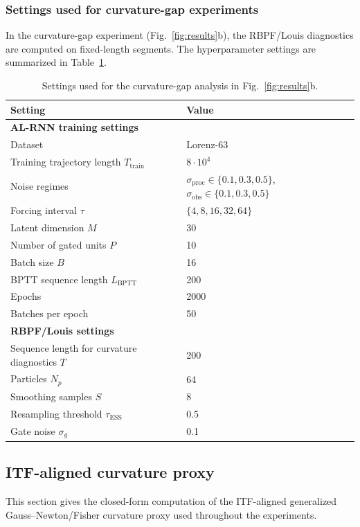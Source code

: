 \documentclass[twoside]{article}
\theoremstyle{plain}
\theoremstyle{definition}
\theoremstyle{remark}
\begin{document}
\subsubsection{Settings used for curvature-gap experiments}
In the curvature-gap experiment (Fig.~\ref{fig:results}b), the RBPF/Louis diagnostics are computed on fixed-length segments. The hyperparameter settings are summarized in Table~\ref{tab:s:rbpf_hparams}.
\begin{table}[!htbp]
\centering
\caption{Settings used for the curvature-gap analysis in Fig.~\ref{fig:results}b.}
\label{tab:s:rbpf_hparams}
{\small\setlength{\tabcolsep}{4pt}\renewcommand{\arraystretch}{1.1}
\begin{tabular}{l l}
\hline
Setting & Value \\
\hline
\multicolumn{2}{l}{\textbf{AL-RNN training settings}}\\
Dataset & Lorenz-63 \\
Training trajectory length $T_{\mathrm{train}}$& $8 \cdot 10^4$ \\
Noise regimes & $\sigma_{\mathrm{proc}}\in\{0.1,0.3,0.5\}$, $\sigma_{\mathrm{obs}}\in\{0.1, 0.3, 0.5\}$ \\
Forcing interval $\tau$ & $\{4,8,16,32,64\}$ \\
Latent dimension $M$ & 30 \\
Number of gated units $P$ & 10 \\
Batch size $B$ & 16 \\
BPTT sequence length $L_{\mathrm{BPTT}}$ & 200 \\
Epochs & 2000\\
Batches per epoch & 50 \\
\hline
\multicolumn{2}{l}{\textbf{RBPF/Louis settings}}\\
Sequence length for curvature diagnostics $T$ & 200 \\
Particles $N_p$ & 64 \\
Smoothing samples $S$ & 8 \\
Resampling threshold $\tau_{\mathrm{ESS}}$ & 0.5 \\
Gate noise $\sigma_g$ & 0.1\\
\hline
\end{tabular}}
\end{table}
\subsection{ITF-aligned curvature proxy}
\label{sec:s:tf_fim}
This section gives the closed-form computation of the ITF-aligned generalized Gauss--Newton/Fisher curvature proxy used throughout the experiments.
\end{document}
